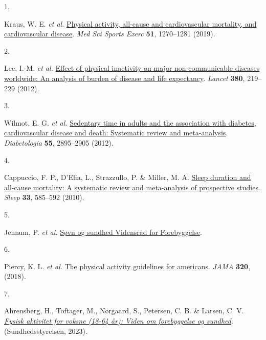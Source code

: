 \documentclass[
  10pt,
]{scrbook}
\newlength{\cslhangindent}
\newlength{\csllabelwidth}
\newlength{\cslentryspacingunit} %
\newenvironment{CSLReferences}[2] %
 {%
  \setlength{\parindent}{0pt}
  \ifodd #1
  \let\oldpar\par
  \def\par{\hangindent=\cslhangindent\oldpar}
  \fi
  \setlength{\parskip}{#2\cslentryspacingunit}
 }%
 {}
\newcommand{\CSLLeftMargin}[1]{\parbox[t]{\csllabelwidth}{#1}}
\newcommand{\CSLRightInline}[1]{\parbox[t]{\linewidth - \csllabelwidth}{#1}\break}
\let\originaltextbf\textbf
\renewcommand{\textbf}[1]{\textcolor{color1}{\textsf{\originaltextbf{#1}}}}
\begin{document}
\hypertarget{refs}{}
\begin{CSLReferences}{0}{0}
\leavevmode{}%
\CSLLeftMargin{1. }%
\CSLRightInline{Kraus, W. E. \emph{et al.}
\href{https://doi.org/10.1249/MSS.0000000000001939}{Physical activity,
all-cause and cardiovascular mortality, and cardiovascular disease}.
\emph{Med Sci Sports Exerc} \textbf{51}, 1270--1281 (2019).}

\leavevmode{}%
\CSLLeftMargin{2. }%
\CSLRightInline{Lee, I.-M. \emph{et al.}
\href{https://doi.org/10.1016/S0140-6736(12)61031-9}{Effect of physical
inactivity on major non-communicable diseases worldwide: An analysis of
burden of disease and life expectancy}. \emph{Lancet} \textbf{380},
219--229 (2012).}

\leavevmode{}%
\CSLLeftMargin{3. }%
\CSLRightInline{Wilmot, E. G. \emph{et al.}
\href{https://doi.org/10.1007/s00125-012-2677-z}{Sedentary time in
adults and the association with diabetes, cardiovascular disease and
death: Systematic review and meta-analysis}. \emph{Diabetologia}
\textbf{55}, 2895--2905 (2012).}

\leavevmode{}%
\CSLLeftMargin{4. }%
\CSLRightInline{Cappuccio, F. P., D'Elia, L., Strazzullo, P. \& Miller,
M. A. \href{https://doi.org/10.1093/sleep/33.5.585}{Sleep duration and
all-cause mortality: A systematic review and meta-analysis of
prospective studies}. \emph{Sleep} \textbf{33}, 585--592 (2010).}

\leavevmode{}%
\CSLLeftMargin{5. }%
\CSLRightInline{Jennum, P. \emph{et al.}
\href{https://vidensraad.dk/rapport/soevn-og-sundhed}{Søvn og sundhed
\textbar{} Vidensråd for Forebyggelse}.}

\leavevmode{}%
\CSLLeftMargin{6. }%
\CSLRightInline{Piercy, K. L. \emph{et al.}
\href{https://doi.org/10.1001/jama.2018.14854}{The physical activity
guidelines for americans}. \emph{{JAMA}} \textbf{320}, (2018).}

\leavevmode{}%
\CSLLeftMargin{7. }%
\CSLRightInline{Ahrensberg, H., Toftager, M., Nørgaard, S., Petersen, C.
B. \& Larsen, C. V. \emph{\href{https://www.sst.dk}{Fysisk aktivitet for
voksne (18-64 år): Viden om forebyggelse og sundhed}}.
(Sundhedsstyrelsen, 2023).}


\end{CSLReferences}
\end{document}
